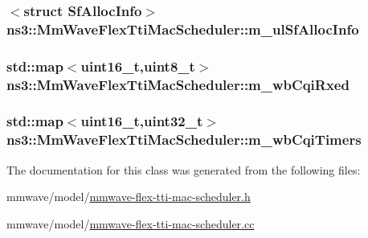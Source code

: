 \subsubsection[{\texorpdfstring{m\+\_\+ul\+Sf\+Alloc\+Info}{m_ulSfAllocInfo}}]{$<$struct {\bf Sf\+Alloc\+Info}$>$ ns3\+::\+Mm\+Wave\+Flex\+Tti\+Mac\+Scheduler\+::m\+\_\+ul\+Sf\+Alloc\+Info\hspace{0.3cm}{\ttfamily [private]}}\hypertarget{classns3_1_1MmWaveFlexTtiMacScheduler_a79bb85066aa83355a90eeebb5881b542}{}\label{classns3_1_1MmWaveFlexTtiMacScheduler_a79bb85066aa83355a90eeebb5881b542}
\subsubsection[{\texorpdfstring{m\+\_\+wb\+Cqi\+Rxed}{m_wbCqiRxed}}]{\setlength{\rightskip}{0pt plus 5cm}std\+::map$<$uint16\+\_\+t,uint8\+\_\+t$>$ ns3\+::\+Mm\+Wave\+Flex\+Tti\+Mac\+Scheduler\+::m\+\_\+wb\+Cqi\+Rxed\hspace{0.3cm}{\ttfamily [private]}}\hypertarget{classns3_1_1MmWaveFlexTtiMacScheduler_ac5f1e12f1e2a6d4e11dbc2baf7c1166a}{}\label{classns3_1_1MmWaveFlexTtiMacScheduler_ac5f1e12f1e2a6d4e11dbc2baf7c1166a}
\subsubsection[{\texorpdfstring{m\+\_\+wb\+Cqi\+Timers}{m_wbCqiTimers}}]{\setlength{\rightskip}{0pt plus 5cm}std\+::map$<$uint16\+\_\+t,uint32\+\_\+t$>$ ns3\+::\+Mm\+Wave\+Flex\+Tti\+Mac\+Scheduler\+::m\+\_\+wb\+Cqi\+Timers\hspace{0.3cm}{\ttfamily [private]}}\hypertarget{classns3_1_1MmWaveFlexTtiMacScheduler_ac223fa16c9b7e57dd628b387833abeed}{}\label{classns3_1_1MmWaveFlexTtiMacScheduler_ac223fa16c9b7e57dd628b387833abeed}


The documentation for this class was generated from the following files\+:\begin{DoxyCompactItemize}
\item 
mmwave/model/\hyperlink{mmwave-flex-tti-mac-scheduler_8h}{mmwave-\/flex-\/tti-\/mac-\/scheduler.\+h}\item 
mmwave/model/\hyperlink{mmwave-flex-tti-mac-scheduler_8cc}{mmwave-\/flex-\/tti-\/mac-\/scheduler.\+cc}\end{DoxyCompactItemize}
